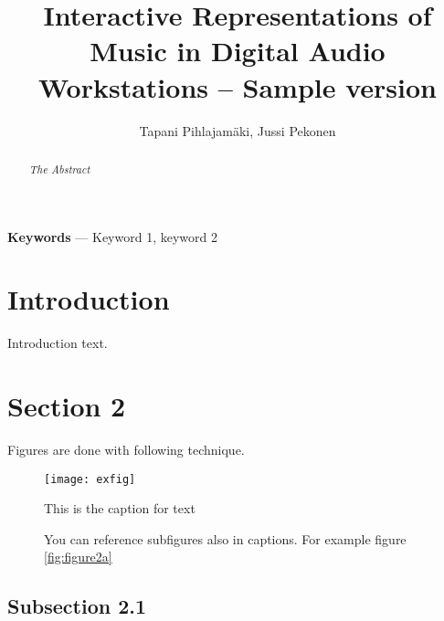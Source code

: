 \documentclass[11pt,a4paper,twoside]{article}
\title{Interactive Representations of Music in Digital Audio Workstations -- Sample version}
\author{Tapani Pihlajamäki, Jussi Pekonen}
\begin{document}
\maketitle

\begin{abstract}
\noindent\it The Abstract
\end{abstract}

\noindent\textbf{Keywords} --- Keyword 1, keyword 2

\section{Introduction}

Introduction text.

\section{Section 2}
\label{sec:section2} %

Figures are done with following technique.

\begin{figure}[htb] %
\begin{center} %
\texttt{[image: exfig]}
\caption{This is the caption for text}
\label{fig:figure1} %
\end{center}
\end{figure}


\begin{figure}[htb] 
\begin{center} 
\caption{You can reference subfigures also in captions. For example figure \ref{fig:figure2a}}
\label{fig:figure2} %
\end{center}
\end{figure}





\subsection{Subsection 2.1}
\end{document}
